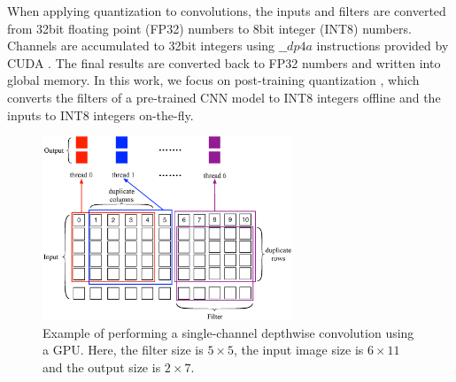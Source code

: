 When applying quantization to convolutions, the inputs and filters are converted from 32bit floating point (FP32) numbers to 8bit integer (INT8) numbers. 
Channels are accumulated to 32bit integers using $\_\_dp4a$ instructions provided by CUDA \cite{cudatoolkit}.
The final results are converted back to FP32 numbers and written into global memory. 
In this work, we focus on post-training quantization \cite{fang2020post,jacob2018quantization}, which converts the filters of a pre-trained CNN model to INT8 integers offline and the inputs to INT8 integers on-the-fly.

\begin{figure}[t!]
\centering
  \includegraphics[width=0.9\columnwidth,height=5.5cm]{./figure/twostrategies.eps}
  \caption{Example of performing a single-channel depthwise convolution using a GPU. Here, the filter size is $5 \times 5$, the input image size is $6 \times 11$
  and the output size is $2 \times 7$.}
  \label{fig:twostrategies}
\end{figure}
